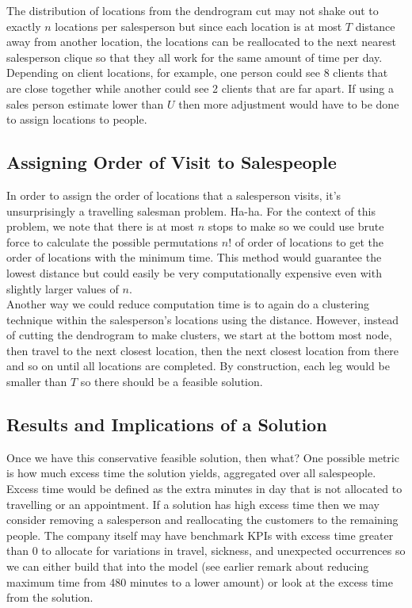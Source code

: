 \documentclass{article}
\begin{document}
The distribution of locations from the dendrogram cut may not shake out to exactly $n$ locations per salesperson but since each location is at most $T$ distance away from another location, the locations can be reallocated to the next nearest salesperson clique so that they all work for the same amount of time per day.  Depending on client locations, for example, one person could see 8 clients that are close together while another could see 2 clients that are far apart.  If using a sales person estimate lower than $U$ then more adjustment would have to be done to assign locations to people.\\

\subsection{Assigning Order of Visit to Salespeople}
In order to assign the order of locations that a salesperson visits, it's unsurprisingly a travelling salesman problem. Ha-ha. For the context of this problem, we note that there is at most $n$ stops to make so we could use brute force to calculate the possible permutations $n!$ of order of locations to get the order of locations with the minimum time. This method would guarantee the lowest distance but could easily be very computationally expensive even with slightly larger values of $n$.\\

Another way we could reduce computation time is to again do a clustering technique within the salesperson's locations using the distance.  However, instead of cutting the dendrogram to make clusters, we start at the bottom most node, then travel to the next closest location, then the next closest location from there and so on until all locations are completed.  By construction, each leg would be smaller than $T$ so there should be a feasible solution.\\

\subsection{Results and Implications of a Solution}
Once we have this conservative feasible solution, then what? One possible metric is how much excess time the solution yields, aggregated over all salespeople.  Excess time would be defined as the extra minutes in day that is not allocated to travelling or an appointment.  If a solution has high excess time then we may consider removing a salesperson and reallocating the customers to the remaining people.  The company itself may have benchmark KPIs with excess time greater than 0 to allocate for variations in travel, sickness, and unexpected occurrences so we can either build that into the model (see earlier remark about reducing maximum time from 480 minutes to a lower amount) or look at the excess time from the solution.\\
\end{document}

